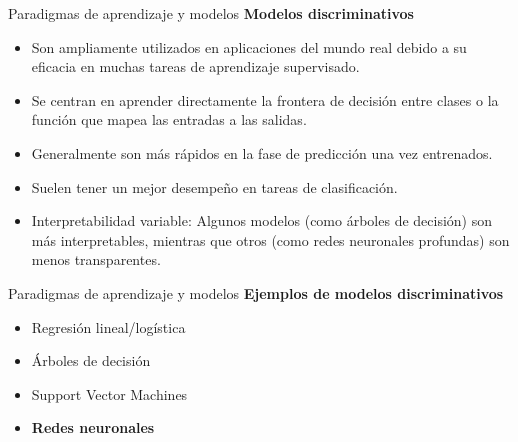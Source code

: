 \begin{frame}{Paradigmas de aprendizaje y modelos}
\textbf{Modelos discriminativos}

\begin{itemize}
    \item Son ampliamente utilizados en aplicaciones del mundo real debido a su eficacia en muchas tareas de aprendizaje supervisado.
    \item Se centran en aprender directamente la frontera de decisión entre clases o la función que mapea las entradas a las salidas.
    \item Generalmente son más rápidos en la fase de predicción una vez entrenados.
    \item Suelen tener un mejor desempeño en tareas de clasificación.
    \item Interpretabilidad variable: Algunos modelos (como árboles de decisión) son más interpretables, mientras que otros (como redes neuronales profundas) son menos transparentes.
\end{itemize}

\end{frame}

\begin{frame}{Paradigmas de aprendizaje y modelos}
\textbf{Ejemplos de modelos discriminativos}

\begin{itemize}
    \item Regresión lineal/logística
    \item Árboles de decisión
    \item Support Vector Machines
    \item \textbf{Redes neuronales}
\end{itemize}

\end{frame}


